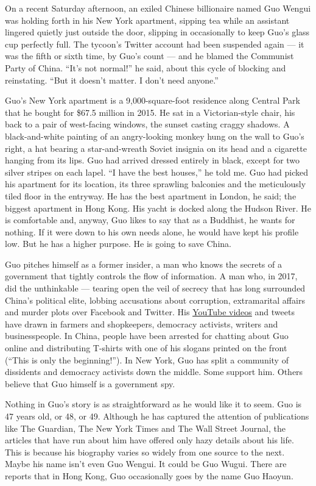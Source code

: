 On a recent Saturday afternoon, an exiled Chinese billionaire named Guo
Wengui was holding forth in his New York apartment, sipping tea while an
assistant lingered quietly just outside the door, slipping in
occasionally to keep Guo's glass cup perfectly full. The tycoon's
Twitter account had been suspended again --- it was the fifth or sixth
time, by Guo's count --- and he blamed the Communist Party of China.
``It's not normal!'' he said, about this cycle of blocking and
reinstating. ``But it doesn't matter. I don't need anyone.''

Guo's New York apartment is a 9,000-square-foot residence along Central
Park that he bought for \$67.5 million in 2015. He sat in a
Victorian-style chair, his back to a pair of west-facing windows, the
sunset casting craggy shadows. A black-and-white painting of an
angry-looking monkey hung on the wall to Guo's right, a hat bearing a
star-and-wreath Soviet insignia on its head and a cigarette hanging from
its lips. Guo had arrived dressed entirely in black, except for two
silver stripes on each lapel. ``I have the best houses,'' he told me.
Guo had picked his apartment for its location, its three sprawling
balconies and the meticulously tiled floor in the entryway. He has the
best apartment in London, he said; the biggest apartment in Hong Kong.
His yacht is docked along the Hudson River. He is comfortable and,
anyway, Guo likes to say that as a Buddhist, he wants for nothing. If it
were down to his own needs alone, he would have kept his profile low.
But he has a higher purpose. He is going to save China.

Guo pitches himself as a former insider, a man who knows the secrets of
a government that tightly controls the flow of information. A man who,
in 2017, did the unthinkable --- tearing open the veil of secrecy that
has long surrounded China's political elite, lobbing accusations about
corruption, extramarital affairs and murder plots over Facebook and
Twitter. His
\href{https://www.youtube.com/channel/UCO3pO3ykAUybrjv3RBbXEHw/videos}{YouTube
videos} and tweets have drawn in farmers and shopkeepers, democracy
activists, writers and businesspeople. In China, people have been
arrested for chatting about Guo online and distributing T-shirts with
one of his slogans printed on the front (``This is only the
beginning!''). In New York, Guo has split a community of dissidents and
democracy activists down the middle. Some support him. Others believe
that Guo himself is a government spy.

Nothing in Guo's story is as straightforward as he would like it to
seem. Guo is 47 years old, or 48, or 49. Although he has captured the
attention of publications like The Guardian, The New York Times and The
Wall Street Journal, the articles that have run about him have offered
only hazy details about his life. This is because his biography varies
so widely from one source to the next. Maybe his name isn't even Guo
Wengui. It could be Guo Wugui. There are reports that in Hong Kong, Guo
occasionally goes by the name Guo Haoyun.

